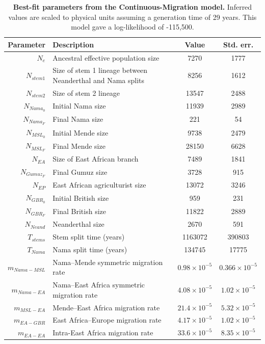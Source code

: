 \documentclass[]{article}
\begin{document}
\begin{table}[ht]
\caption{
    \label{tab:supp-continuous-migration}
    \textbf{Best-fit parameters from the Continuous-Migration model.}
    Inferred values are scaled to physical units assuming a generation time of
    29 years. This model gave a log-likelihood of -115,500.
}
\centering
\begin{tabular}[t]{rP{8cm}cc}
    \toprule
    Parameter & Description & Value & Std. err.\\
    \midrule
    $N_e$ & Ancestral effective population size & 7270 & 1777 \\
    $N_{stem1}$ & Size of stem 1 lineage between Neanderthal and Nama splits & 8256 & 1612 \\
    $N_{stem2}$ & Size of stem 2 lineage & 13547 & 2488 \\
    $N_{Nama_0}$ & Initial Nama size & 11939 & 2989 \\
    $N_{Nama_F}$ & Final Nama size & 221 & 54 \\
    $N_{MSL_0}$ & Initial Mende size & 9738 & 2479 \\
    $N_{MSL_F}$ & Final Mende size & 28150 & 6628 \\
    $N_{EA}$ & Size of East African branch & 7489 & 1841 \\
    $N_{Gumuz_F}$ & Final Gumuz size & 3728 & 915 \\
    $N_{EP}$ & East African agriculturist size & 13072 & 3246 \\
    $N_{GBR_0}$ & Initial British size & 959 & 231 \\
    $N_{GBR_F}$ & Final British size & 11822 & 2889 \\
    $N_{Neand}$ & Neanderthal size & 2670 & 591 \\
    $T_{stems}$ & Stem split time (years) & 1163072 & 390803 \\
    $T_{Nama}$ & Nama split time (years) & 134745 & 17775 \\
    $m_{Nama-MSL}$ & Nama--Mende symmetric migration rate & $0.98\times10^{-5}$ & $0.366\times10^{-5}$ \\
    $m_{Nama-EA}$ & Nama--East Africa symmetric migration rate & $4.08\times10^{-5}$ & $1.02\times10^{-5}$ \\
    $m_{MSL-EA}$ & Mende--East Africa migration rate & $21.4\times10^{-5}$ & $5.32\times10^{-5}$ \\
    $m_{EA-GBR}$ & East Africa--Europe migration rate & $4.17\times10^{-5}$ & $1.02\times10^{-5}$ \\
    $m_{EA-EA}$ & Intra-East Africa migration rate & $33.6\times10^{-5}$ & $8.35\times10^{-5}$ \\

\end{tabular}
\end{table}
\end{document}
